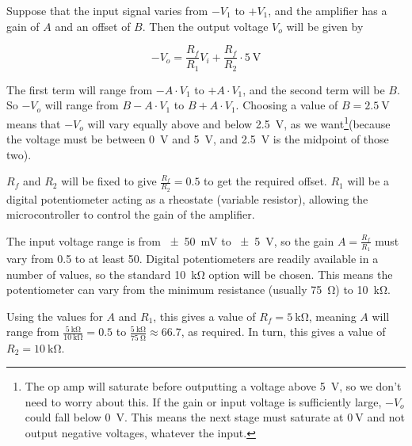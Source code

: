 Suppose that the input signal varies from $-V_1$ to $+V_1$, and the amplifier
has a gain of $A$ and an offset of $B$. Then the output voltage $V_o$ will be
given by

\begin{equation*}
  -V_o = \frac{R_f}{R_1} V_i + \frac{R_f}{R_2} \cdot \SI{5}{\volt}
\end{equation*}

The first term will range from $-A\cdot V_1$ to $+A\cdot V_1$, and the second
term will be $B$. So $-V_o$ will range from $B-A\cdot V_1$ to $B+A\cdot V_1$.
Choosing a value of $B=\SI{2.5}{\volt}$ means that $-V_o$ will vary equally
above and below \SI{2.5}{\volt}, as we want\footnote{The op amp will saturate
before outputting a voltage above \SI{5}{\volt}, so we don't need to worry about
this. If the gain or input voltage is sufficiently large, $-V_o$ could fall
below \SI{0}{\volt}. This means the next stage must saturate at $\SI{0}{\volt}$
and not output negative voltages, whatever the input.  }(because the voltage
must be between \SI{0}{\volt} and \SI{5}{\volt}, and \SI{2.5}{\volt} is the
midpoint of those two).

$R_f$ and $R_2$ will be fixed to give $\frac{R_f}{R_2}=0.5$ to get the required
offset. $R_1$ will be a digital potentiometer acting as a rheostate (variable
resistor), allowing the microcontroller to control the gain of the amplifier.

The input voltage range is from \SI{\pm 50}{\mV} to \SI{\pm 5}{\V}, so the gain
$A=\frac{R_f}{R_1}$ must vary from 0.5 to at least 50.  Digital potentiometers
are readily available in a number of values, so the standard \SI{10}{\kilo\ohm}
option will be chosen. This means the potentiometer can vary from the minimum
resistance (usually \SI{75}{\ohm}) to \SI{10}{\kilo\ohm}.

Using the values for $A$ and $R_1$, this gives a value of
$R_f=\SI{5}{\kilo\ohm}$, meaning $A$ will range from
$\frac{\SI{5}{\kilo\ohm}}{\SI{10}{\kilo\ohm}}=0.5$ to
$\frac{\SI{5}{\kilo\ohm}}{\SI{75}{\ohm}} \approx 66.7$, as required.  In turn,
this gives a value of $R_2 = \SI{10}{\kilo\ohm}$.

